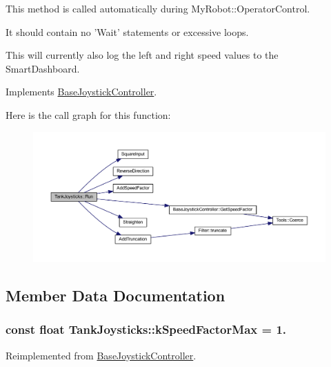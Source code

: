 \-This method is called automatically during \-My\-Robot\-::\-Operator\-Control. 

\-It should contain no '\-Wait' statements or excessive loops.

\-This will currently also log the left and right speed values to the \-Smart\-Dashboard. 

\-Implements \hyperlink{class_base_joystick_controller_a8da5328dc760aa08edade5adb793d0c4}{\-Base\-Joystick\-Controller}.



\-Here is the call graph for this function\-:\nopagebreak
\begin{figure}[H]
\begin{center}
\leavevmode
\includegraphics[width=350pt]{class_tank_joysticks_a77b5b392042169bb9cf2f67400870fb8_cgraph}
\end{center}
\end{figure}




\subsection{\-Member \-Data \-Documentation}
\hypertarget{class_tank_joysticks_accc26be7603ec654301c9067920a070d}{
\subsubsection[{k\-Speed\-Factor\-Max}]{\setlength{\rightskip}{0pt plus 5cm}const float {\bf \-Tank\-Joysticks\-::k\-Speed\-Factor\-Max} = 1.}}\label{class_tank_joysticks_accc26be7603ec654301c9067920a070d}


\-Reimplemented from \hyperlink{class_base_joystick_controller_ac6514f3d3abc38719f47e5e07ea61f0a}{\-Base\-Joystick\-Controller}.

